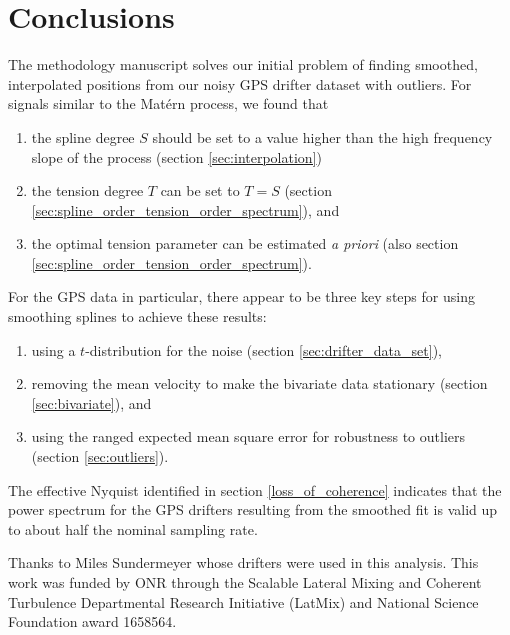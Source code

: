 \documentclass{ametsoc}
\begin{document}
\section{Conclusions}

The methodology manuscript solves our initial problem of finding smoothed, interpolated positions from our noisy GPS drifter dataset with outliers. For signals similar to the Mat\'ern process, we found that
\begin{enumerate}
\item the spline degree $S$ should be set to a value higher than the high frequency slope of the process (section \ref{sec:interpolation})
\item the tension degree $T$ can be set to $T=S$ (section \ref{sec:spline_order_tension_order_spectrum}), and
\item the optimal tension parameter can be estimated \emph{a priori} (also section \ref{sec:spline_order_tension_order_spectrum}).
\end{enumerate}
For the GPS data in particular, there appear to be three key steps for using smoothing splines to achieve these results:
\begin{enumerate}
    \item using a $t$-distribution for the noise (section \ref{sec:drifter_data_set}),
    \item removing the mean velocity to make the bivariate data stationary (section \ref{sec:bivariate}), and
    \item using the ranged expected mean square error for robustness to outliers (section \ref{sec:outliers}).
\end{enumerate}
The effective Nyquist identified in section \ref{loss_of_coherence} indicates that the power spectrum for the GPS drifters resulting from the smoothed fit is valid up to about half the nominal sampling rate.

\acknowledgments
Thanks to Miles Sundermeyer whose drifters were used in this analysis. This work was funded by ONR through the Scalable Lateral Mixing and Coherent Turbulence Departmental Research Initiative (LatMix) and National Science Foundation award 1658564.

%
\appendix[A]
%

\label{sec:numerical_implementation}
\end{document}
